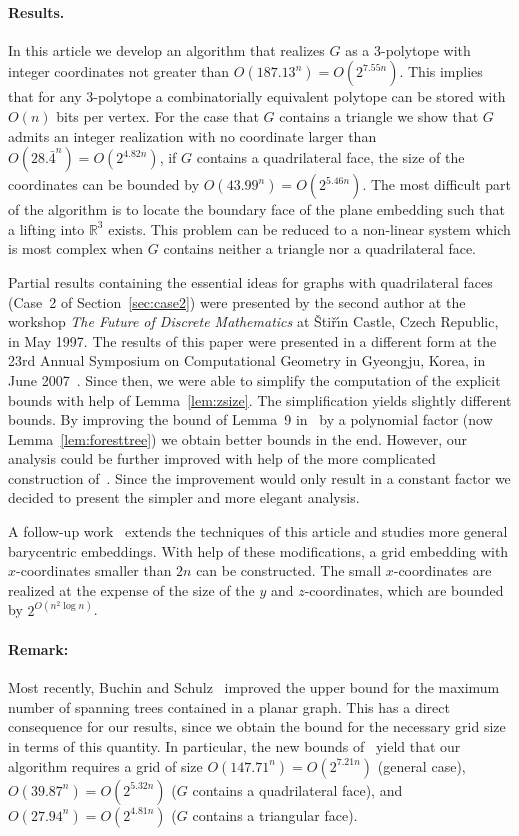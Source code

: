 \documentclass{article}
\theoremstyle{plain} \newtheorem{thm}{Theorem}[section]
\newcommand{\R}{\mathbb{R}}
\begin{document}
\paragraph{Results.}
In this article we develop an algorithm that realizes $G$ as a 3-polytope with
integer coordinates not greater than $O(187{.}13^n)=O(2^{7.55n})$. 
This implies that for any $3$-polytope a combinatorially  equivalent polytope can be stored
with $O(n)$ bits per vertex. 
For the case that $G$ contains a triangle we show that $G$ admits an integer realization with no coordinate larger than $O(28{.}\bar 4^n)=O(2^{4.82n})$, if $G$ contains a quadrilateral  face, the size of the coordinates can be bounded by $O(43.99^n)=O(2^{5.46n})$. The most difficult part of the algorithm is to locate the boundary face of the plane embedding such that a lifting into $\R^3$ exists. This problem can be reduced to a non-linear system which is most complex when $G$ contains neither a triangle nor a quadrilateral face.



Partial results containing
the essential ideas for graphs with quadrilateral faces (Case~2
of Section~\ref{sec:case2}) were presented by the second author
at the workshop \emph{The Future of Discrete Mathematics}
at {\v Sti\v r\'\i n} Castle, Czech Republic, in May 1997.
The results of this paper were presented in a different form
at the 23rd Annual Symposium on Computational Geometry
 in Gyeongju, Korea, in June 2007~\cite{rrs-epsg-07}. Since then, we were able to simplify the computation of the explicit bounds with help of Lemma~\ref{lem:zsize}. The simplification yields slightly different bounds. 
By improving the bound of Lemma~9 in~\cite{rrs-epsg-07} by a polynomial factor (now  Lemma~\ref{lem:foresttree}) 
we obtain better bounds in the end.
However, our analysis could be further improved with help of the more complicated construction of~\cite{rrs-epsg-07}. 
Since the improvement would only result in a constant factor we decided to present the simpler and more elegant analysis. 

 A follow-up work~\cite{s-dpgvr-09} extends the techniques of this article
and studies more general barycentric embeddings.
With help of these modifications, a grid embedding with $x$-coordinates
smaller than $2n$ can be constructed. The small $x$-coordinates are
realized at the expense of the size of the $y$ and $z$-coordinates,
which are bounded by $2^{O(n^2\log n)}$.


\paragraph{Remark:}
Most recently, Buchin and Schulz~\cite{BS10} improved the upper bound for the maximum number of spanning trees contained in a planar graph. 
This has a direct consequence for our results, since we obtain the bound for the necessary grid size in terms of this quantity. In particular, the new bounds of~\cite{BS10} yield that our algorithm requires a grid of size $O(147{.}71^n)=O(2^{7.21n})$ (general case), $O(39{.}87^n)=O(2^{5.32n})$ ($G$ contains a quadrilateral face), and $O(27{.}94^n)=O(2^{4.81n})$ ($G$ contains a triangular face).
\end{document}
